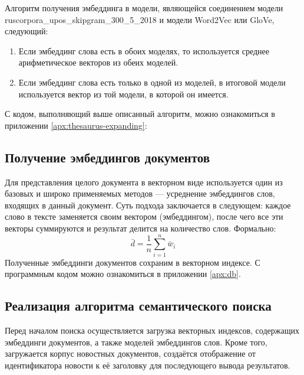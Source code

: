 \documentclass[coursework]{SCWorks}
\begin{document}
Алгоритм получения эмбеддинга в модели, являющейся соединением модели ruscorpora\_upos\_skipgram\_300\_5\_2018 и модели Word2Vec или GloVe, следующий:
\begin{enumerate}
    \item Если эмбеддинг слова есть в обоих моделях, то используется среднее арифметическое векторов из обеих моделей.
    \item Если эмбеддинг слова есть только в одной из моделей, в итоговой модели используется вектор из той модели, в которой он имеется.
\end{enumerate}

С кодом, выполняющий выше описанный алгоритм, можно ознакомиться в приложении \ref{apx:thesaurus-expanding}:

\subsection{Получение эмбеддингов документов}
Для представления целого документа в векторном виде используется один из базовых и широко применяемых методов — усреднение эмбеддингов слов, входящих в данный документ. Суть подхода заключается в следующем: каждое слово в тексте заменяется своим вектором (эмбеддингом), после чего все эти векторы суммируются и результат делится на количество слов. Формально:
$$
    \bar{d} = \frac{1}{n} \sum_{i = 1}^n \bar{w}_i
$$
Полученные эмбеддинги документов сохраним в векторном индексе. С программным кодом можно ознакомиться в приложении \ref{apx:db}.

\subsection{Реализация алгоритма семантического поиска}

Перед началом поиска осуществляется загрузка векторных индексов, содержащих эмбеддинги документов, а также моделей эмбеддингов слов. Кроме того, загружается корпус новостных документов, создаётся отображение от идентификатора новости к её заголовку для последующего вывода результатов.
\end{document}
